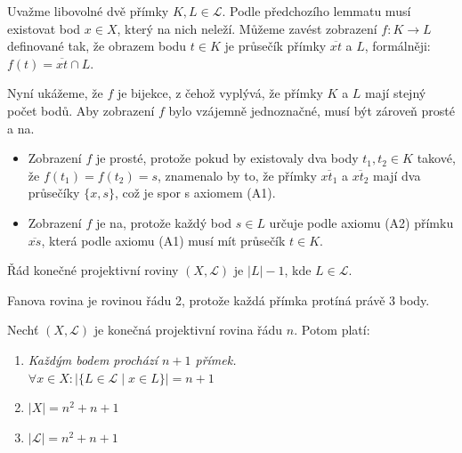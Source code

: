 \begin{t_proof}
  Uvažme libovolné dvě přímky $K, L\in\mathcal{L}$. Podle předchozího lemmatu musí existovat bod $x\in X$, který na nich neleží. Můžeme zavést zobrazení $f:K\rightarrow L$ definované tak, že obrazem bodu $t\in K$ je průsečík přímky $\overline{xt}$ a $L$, formálněji: $f(t)=\overline{xt}\cap L$. 
  
  Nyní ukážeme, že $f$ je bijekce, z čehož vyplývá, že přímky $K$ a $L$ mají stejný počet bodů. Aby zobrazení $f$ bylo vzájemně jednoznačné, musí být zároveň prosté a na. 
  \begin{itemize}
    \item
    Zobrazení $f$ je prosté, protože pokud by existovaly dva body $t_1, t_2\in K$ takové, že $f(t_1)=f(t_2)=s$, znamenalo by to, že přímky $\overline{xt_1}$ a $\overline{xt_2}$ mají dva průsečíky $\{x,s\}$, což je spor s axiomem (A1).
    
    \item
    Zobrazení $f$ je na, protože každý bod $s\in L$ určuje podle axiomu (A2) přímku $\overline{xs}$, která podle axiomu (A1) musí mít průsečík $t\in K$.
  \end{itemize}
\end{t_proof}

\begin{t_definition}
  Řád konečné projektivní roviny $(X,\mathcal{L})$ je $|L|-1$, kde $L\in\mathcal{L}$.
\end{t_definition}

\begin{t_example}
  Fanova rovina je rovinou řádu 2, protože každá přímka protíná právě 3 body.
\end{t_example}

\begin{t_theorem}
  Nechť $(X,\mathcal{L})$ je konečná projektivní rovina řádu $n$. Potom platí:
  \begin{enumerate}
    \item
    \textit{Každým bodem prochází $n+1$ přímek.}
    \\$\forall x\in X:|\{L\in\mathcal{L}\mid x\in L\}| = n+1$
    
    \item
    $|X|=n^2+n+1$
    
    \item
    $|\mathcal{L}|=n^2+n+1$
  \end{enumerate}
\end{t_theorem}

